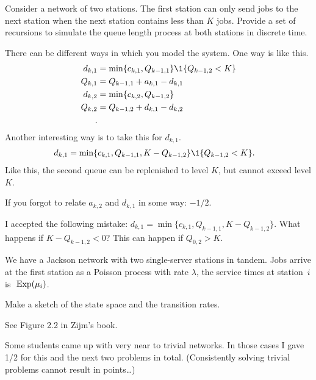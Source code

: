 \begin{exercise}[201804]
Consider a network of two stations. The first station can only send jobs to the next station when the next station contains less than $K$ jobs. Provide a set of recursions to simulate the queue length process at both stations in discrete time. 

\begin{solution}
 There can be different ways in which you model the system. One way is like this.
 \begin{align*}
 d_{k,1} &= \min\{c_{k,1}, Q_{k-1, 1}\}\1{Q_{k-1,2}<K} \\
 Q_{k,1} &= Q_{k-1,1} + a_{k,1} - d_{k,1}\\
 d_{k,2} &= \min\{c_{k,2}, Q_{k-1, 2}\} \\
 Q_{k,2} &= Q_{k-1,2} + d_{k,1} - d_{k,2}\\.
 \end{align*}
Another interesting way is to take this for $d_{k,1}$.
 \begin{align*}
 d_{k,1} &= \min\{c_{k,1}, Q_{k-1, 1}, K-Q_{k-1,2}\}\1{Q_{k-1,2}<K}.
 \end{align*}
Like this, the second queue can be replenished to level $K$, but cannot exceed level $K$. 

If you forgot to relate $a_{k,2}$ and $d_{k,1}$ in some way: $-1/2$. 

I accepted the following mistake: 
$d_{k,1} = \min\{c_{k,1}, Q_{k-1, 1}, K-Q_{k-1,2}\}$. What happens if $K-Q_{k-1,2}<0$? This can happen if $Q_{0,2} > K$.

\end{solution}
\end{exercise}

We have a Jackson network with two single-server stations in tandem. Jobs
arrive at the first station as a Poisson process with rate $\lambda$,
the service times at station~$i$ is $~\operatorname{Exp}(\mu_i)$.


\begin{exercise}[201804]
Make a sketch of the state space and the transition rates.
\begin{solution}
 See Figure 2.2 in Zijm's book.

Some students came up with very near to trivial networks. In those cases I gave 1/2 for this and the next two problems in total. (Consistently solving trivial problems cannot result in points\ldots)
\end{solution}
\end{exercise}

